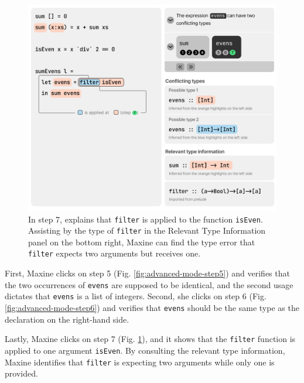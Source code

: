 \begin{figure}
        \centering
        \includegraphics[width=\linewidth]{images/advanced-mode-3.pdf}
        \caption{
            In step 7, \chameleon{} 
            explains that \texttt{filter} is applied to 
            the function \texttt{isEven}. Assisting by 
            the type of \texttt{filter} in the 
            Relevant Type Information panel on the bottom
            right, Maxine can find the type error that 
            \texttt{filter} expects two arguments but receives one.
        }
        \label{fig:advanced-mode-step7}
\end{figure}



First, Maxine clicks on step 5 (Fig. \ref{fig:advanced-mode-step5}) and verifies
that the two occurrences of \texttt{evens} are supposed to be identical, and the
second usage dictates that \texttt{evens} is a list of integers. Second, she
clicks on step 6 (Fig. \ref{fig:advanced-mode-step6}) and verifies that
\texttt{evens} should be the same type as the declaration on the right-hand
side. 


Lastly, Maxine clicks on step 7 (Fig. \ref{fig:advanced-mode-step7}), and
it shows that the \texttt{filter} function is applied to one argument
\texttt{isEven}. By consulting the relevant type information, Maxine identifies
that \texttt{filter} is expecting two arguments while only one is provided. 


